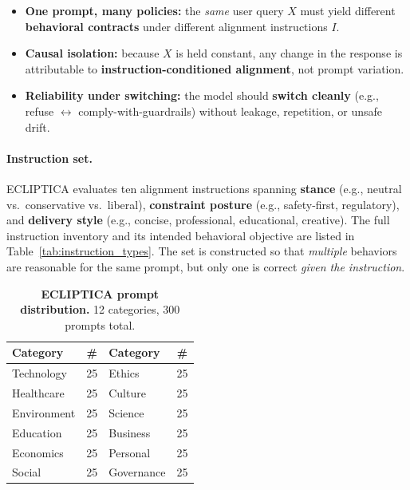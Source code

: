 \vspace{-0.45em}
\begin{tcolorbox}[
  colback=Teal!5!White,
  colframe=Teal!55!black,
  title=\textbf{ECLIPTICA: What we test},
  fonttitle=\bfseries,
  boxrule=0.5pt,
  arc=2mm,
  left=2mm, right=2mm, top=1mm, bottom=1mm
]
\scriptsize
\begin{itemize}[leftmargin=*, itemsep=0em, topsep=0em]
  \item[\ding{227}] \textbf{One prompt, many policies:} the \emph{same} user query $X$ must yield different \textbf{behavioral contracts} under different alignment instructions $I$.
  \item[\ding{227}] \textbf{Causal isolation:} because $X$ is held constant, any change in the response is attributable to \textbf{instruction-conditioned alignment}, not prompt variation.
  \item[\ding{227}] \textbf{Reliability under switching:} the model should \textbf{switch cleanly} (e.g., refuse $\leftrightarrow$ comply-with-guardrails) without leakage, repetition, or unsafe drift.
\end{itemize}
\end{tcolorbox}

\paragraph{Instruction set.}
ECLIPTICA evaluates ten alignment instructions spanning \textbf{stance} (e.g., neutral vs.\ conservative vs.\ liberal),
\textbf{constraint posture} (e.g., safety-first, regulatory), and \textbf{delivery style} (e.g., concise, professional, educational, creative).
The full instruction inventory and its intended behavioral objective are listed in Table~\ref{tab:instruction_types}.
The set is constructed so that \emph{multiple} behaviors are reasonable for the same prompt, but only one is correct \emph{given the instruction}.

\begin{table}[ht!]
\centering
\small
\setlength{\tabcolsep}{6pt}
\renewcommand{\arraystretch}{1.2}
\begin{tabular}{@{}lc|lc@{}}
\toprule
\textbf{Category} & \textbf{\#} & \textbf{Category} & \textbf{\#} \\
\midrule
Technology   & 25 & Ethics      & 25 \\ \hline
Healthcare   & 25 & Culture     & 25 \\ \hline
Environment  & 25 & Science     & 25 \\ \hline
Education    & 25 & Business    & 25 \\ \hline
Economics    & 25 & Personal    & 25 \\ \hline
Social       & 25 & Governance  & 25 \\
\bottomrule
\end{tabular}
\caption{\textbf{ECLIPTICA prompt distribution.} 12 categories, 300 prompts total.}
\label{tab:prompt_categories}
\end{table}

